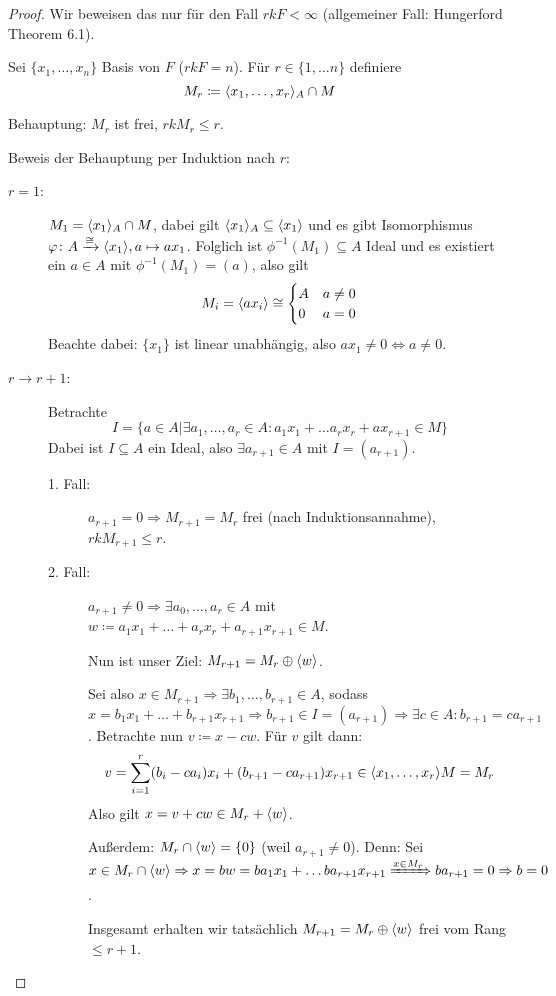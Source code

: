 \documentclass[12pt,a4paper]{scrartcl}
\theoremstyle{cplain}
\theoremstyle{cdef}
\begin{document}
\begin{proof}
	Wir beweisen das nur für den Fall $rk F<\infty$ (allgemeiner Fall: Hungerford Theorem 6.1).
	
	Sei $\{x_1,\dots, x_n\}$ Basis von $F$ ($rk F = n$). Für $r\in\{1,\dots n\}$ definiere
	$$M_r\coloneqq \langle x_1,\dots, x_r\rangle_A\cap M$$
	
	\noindent
	Behauptung: $M_r$ ist frei, $rk M_r\leq r$.
	
	\noindent Beweis der Behauptung per Induktion nach $r$:
	\begin{description}
		\item[$r = 1$:] $M_1 = \langle x_1\rangle_A\cap M$, dabei gilt $\langle x_1\rangle_A\subseteq \langle x_1\rangle$ und es gibt Isomorphismus $\varphi\colon A\xrightarrow{\cong} \langle x_1\rangle, a\mapsto ax_1$. Folglich ist $\phi^{-1}(M_1)\subseteq A$ Ideal und es existiert ein $a\in A$ mit $\phi^{-1}(M_1) = (a)$, also gilt $$M_i = \langle ax_i\rangle \cong \begin{cases} A & a\neq 0\\ 0& a= 0\end{cases}$$
		Beachte dabei: $\{x_1\}$ ist linear unabhängig, also $ax_1\neq 0 \Leftrightarrow a\neq 0$.
		\item[$r\to r+1$:] Betrachte
		$$ I = \{a\in A|\exists a_1,\dots, a_r\in A: a_1x_1+\dots a_rx_r+ax_{r+1}\in M\}$$
		Dabei ist $I\subseteq A$ ein Ideal, also $\exists a_{r+1}\in A$ mit $I = (a_{r+1})$.
		\begin{description}
			\item[1. Fall:] $a_{r+1} = 0 \Rightarrow M_{r+1} = M_r$ frei (nach Induktionsannahme), $rk M_{r+1}\leq r$.
			\item[2. Fall:] $a_{r+1}\neq 0\Rightarrow \exists a_0,\dots, a_r\in A$ mit $w\coloneqq a_1x_1+\dots+a_rx_r+a_{r+1}x_{r+1}\in M$.
			
			Nun ist unser Ziel: $M_{r+1} = M_r\oplus \langle w\rangle$.
			
			Sei also $x\in M_{r+1}\Rightarrow\exists b_1,\dots, b_{r+1}\in A$, sodass $x = b_1x_1+\dots + b_{r+1}x_{r+1}\Rightarrow b_{r+1}\in I = (a_{r+1})\Rightarrow \exists c\in A: b_{r+1} = ca_{r+1}$. Betrachte nun $v\coloneqq x-cw$. Für $v$ gilt dann:
			$$ v= \sum_{i = 1}^r (b_i-ca_i)x_i+(b_{r+1}-ca_{r+1})x_{r+1}\in \langle x_1,\dots, x_r\rangle M = M_r$$
			Also gilt $x = v+cw\in M_r+\langle w\rangle$.
			
			Außerdem: $M_r\cap\langle w\rangle = \{0\}$ (weil $a_{r+1}\neq 0$). Denn: Sei $x\in M_r\cap\langle w\rangle\Rightarrow x = bw = ba_1x_1+\dots ba_{r+1}x_{r+1}\xRightarrow{x\in M_r} ba_{r+1} = 0\Rightarrow b = 0$.
			
			Insgesamt erhalten wir tatsächlich $M_{r+1} = M_r\oplus \langle w\rangle$ frei vom Rang $\leq r+1$. \qedhere 
		\end{description}
	\end{description}
	
\end{proof}
\end{document}
